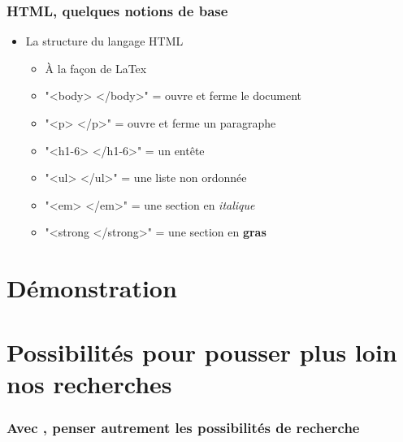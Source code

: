 \documentclass{beamer}
\begin{document}
      \begin{frame}
        \frametitle{HTML, quelques notions de base}
          \begin{itemize}
            \item<2-> La structure du langage HTML
              \begin{itemize}
                \item À la façon de LaTex
                \item "<body> </body>" = ouvre et ferme le document
                \item "<p> </p>" = ouvre et ferme un paragraphe
                \item "<h1-6> </h1-6>" = un entête
                \item "<ul> </ul>" =  une liste non ordonnée 
                \item "<em> </em>" = une section en \textit{italique}
                \item "<strong </strong>" = une section en \textbf{gras}
              \end{itemize}
            \end{itemize}
      \end{frame}
     \section{Démonstration}




\section{Possibilités pour pousser plus loin nos recherches}


    \begin{frame}
    
        \frametitle{Avec \R, penser autrement les possibilités de recherche} \vspace{1cm}
    
    \end{frame}


\end{document}
